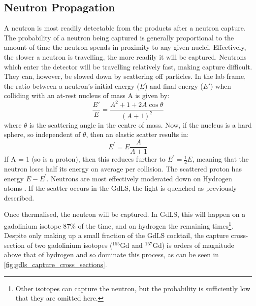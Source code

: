 \subsection{Neutron Propagation}
\par
A neutron is most readily detectable from the products after a neutron capture.
The probability of a neutron being captured is generally proportional to the amount of time the neutron spends in proximity to any given nuclei.
Effectively, the slower a neutron is travelling, the more readily it will be captured.
Neutrons which enter the detector will be travelling relatively fast, making capture difficult.
They can, however, be slowed down by scattering off particles.
In the lab frame, the ratio between a neutron's initial energy ($E$) and final energy ($E'$) when colliding with an at-rest nucleus of mass A is given by:
\begin{equation}
    \frac{E'}{E} = \frac{A^2 + 1 + 2A\cos{\theta}}{(A + 1)^2}
\end{equation}
where $\theta$ is the scattering angle in the centre of mass.
Now, if the nucleus is a hard sphere, so independent of $\theta$, then an elastic scatter results in:
\begin{equation}
    E^{'} = E\frac{A}{A+1}
\end{equation}
If A = 1 (so is a proton), then this reduces further to $E^{'} = \frac{1}{2}E$, meaning that the neutron loses half its energy on average per collision.
The scattered proton has energy $E - E^{'}$.
Neutrons are most effectively moderated down on Hydrogen atoms \cite{neutron_thermalisation_and_capture_ref}.
If the scatter occurs in the GdLS, the light is quenched as previously described.
\par
Once thermalised, the neutron will be captured.
In GdLS, this will happen on a gadolinium isotope 87\% of the time, and on hydrogen the remaining times\footnote{Other isotopes can capture the neutron, but the probability is sufficiently low that they are omitted here.}.
Despite only making up a small fraction of the GdLS cocktail, the capture cross-section of two gadolinium isotopes (${}^{155}$Gd and ${}^{157}$Gd) is orders of magnitude above that of hydrogen and so dominate this process, as can be seen in \autoref{fig:gdls_capture_cross_sections}.



